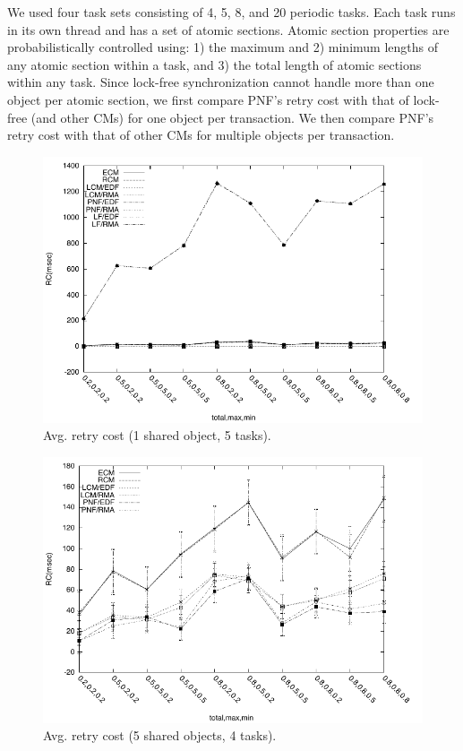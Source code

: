 \documentclass[twocolumn]{article}
\begin{document}
We used four task sets consisting of 4, 5, 8, and 20 periodic tasks. Each task runs in its own thread and has a set of atomic sections. Atomic section properties are probabilistically controlled using: 1) the maximum and 2) minimum lengths of any atomic section within a task, and 3) the total length of atomic sections within any task. Since lock-free synchronization cannot handle more than one object per atomic section, we first compare PNF's retry cost with that of lock-free (and other CMs) for one object per transaction. We then compare PNF's retry cost with that of other CMs for multiple objects per transaction.

\begin{figure}[h]
\centering
\includegraphics[scale=0.5]{figures/Abr_dur_5t_1obj_1wr}
\caption{Avg. retry cost (1 shared object, 5 tasks).}
\label{fig:pnf_results_uniobject}
\end{figure}

\begin{figure}[h]
\centering
\includegraphics[scale=0.5]{figures/Abr_dur_4t_5obj_1wr}
\caption{Avg. retry cost (5 shared objects, 4 tasks).}
\label{fig-RC-pnf-4t}
\end{figure}
\end{document}
